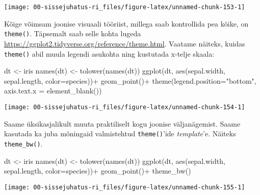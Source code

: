 \documentclass[
]{book}
\newenvironment{Shaded}{\begin{snugshade}}{\end{snugshade}}
\newcommand{\AttributeTok}[1]{\textcolor[rgb]{0.77,0.63,0.00}{#1}}
\newcommand{\FunctionTok}[1]{\textcolor[rgb]{0.00,0.00,0.00}{#1}}
\newcommand{\NormalTok}[1]{#1}
\newcommand{\OtherTok}[1]{\textcolor[rgb]{0.56,0.35,0.01}{#1}}
\newcommand{\SpecialCharTok}[1]{\textcolor[rgb]{0.00,0.00,0.00}{#1}}
\newcommand{\StringTok}[1]{\textcolor[rgb]{0.31,0.60,0.02}{#1}}
\begin{document}
\begin{center}\texttt{[image: 00-sissejuhatus-ri\_files/figure-latex/unnamed-chunk-153-1]} \end{center}

Kõige võimsam joonise visuaali tööriist, millega saab kontrollida pea kõike, on \texttt{theme()}. Täpsemalt saab selle kohta lugeda \url{https://ggplot2.tidyverse.org/reference/theme.html}. Vaatame näiteks, kuidas \texttt{theme()} abil muula legendi asukohta ning kustutada x-telje skaala:

\begin{Shaded}
\begin{Highlighting}[]
\NormalTok{dt }\OtherTok{\textless{}{-}}\NormalTok{ iris}
\FunctionTok{names}\NormalTok{(dt) }\OtherTok{\textless{}{-}} \FunctionTok{tolower}\NormalTok{(}\FunctionTok{names}\NormalTok{(dt))}
\FunctionTok{ggplot}\NormalTok{(dt, }\FunctionTok{aes}\NormalTok{(sepal.width, sepal.length, }\AttributeTok{color=}\NormalTok{species))}\SpecialCharTok{+}
  \FunctionTok{geom\_point}\NormalTok{()}\SpecialCharTok{+}
  \FunctionTok{theme}\NormalTok{(}\AttributeTok{legend.position=}\StringTok{"bottom"}\NormalTok{,}
        \AttributeTok{axis.text.x =} \FunctionTok{element\_blank}\NormalTok{())}
\end{Highlighting}
\end{Shaded}

\begin{center}\texttt{[image: 00-sissejuhatus-ri\_files/figure-latex/unnamed-chunk-154-1]} \end{center}

Saame üksikasjalikult muuta praktiliselt kogu joonise väljanägemist. Saame kasutada ka juba mõningaid valmistehtud \texttt{theme()}'ide \emph{template}'e. Näiteks \texttt{theme\_bw()}.

\begin{Shaded}
\begin{Highlighting}[]
\NormalTok{dt }\OtherTok{\textless{}{-}}\NormalTok{ iris}
\FunctionTok{names}\NormalTok{(dt) }\OtherTok{\textless{}{-}} \FunctionTok{tolower}\NormalTok{(}\FunctionTok{names}\NormalTok{(dt))}
\FunctionTok{ggplot}\NormalTok{(dt, }\FunctionTok{aes}\NormalTok{(sepal.width, sepal.length, }\AttributeTok{color=}\NormalTok{species))}\SpecialCharTok{+}
  \FunctionTok{geom\_point}\NormalTok{()}\SpecialCharTok{+}
  \FunctionTok{theme\_bw}\NormalTok{()}
\end{Highlighting}
\end{Shaded}

\begin{center}\texttt{[image: 00-sissejuhatus-ri\_files/figure-latex/unnamed-chunk-155-1]} \end{center}
\end{document}
